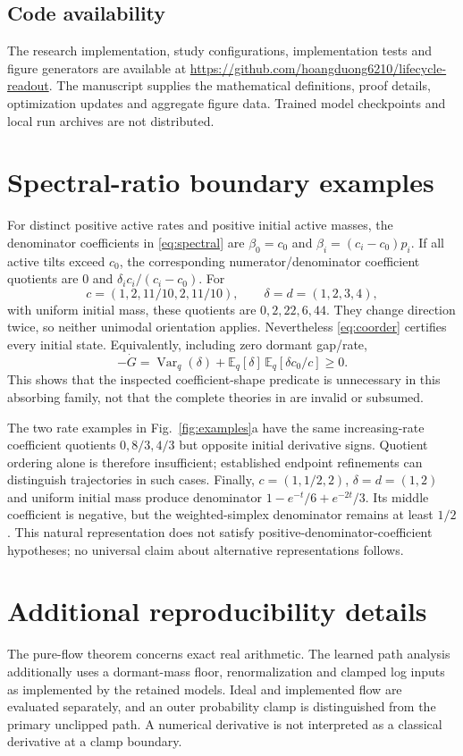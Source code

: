 \subsection*{Code availability}
The research implementation, study configurations, implementation tests and figure generators are available at \url{https://github.com/hoangduong6210/lifecycle-readout}. The manuscript supplies the mathematical definitions, proof details, optimization updates and aggregate figure data. Trained model checkpoints and local run archives are not distributed.
\begin{appendices}
\section{Spectral-ratio boundary examples}\label{app:spectral}
For distinct positive active rates and positive initial active masses, the denominator coefficients in \eqref{eq:spectral} are $\beta_0=c_0$ and $\beta_i=(c_i-c_0)p_i$. If all active tilts exceed $c_0$, the corresponding numerator/denominator coefficient quotients are $0$ and $\delta_i c_i/(c_i-c_0)$. For
\[
c=(1,2,11/10,2,11/10),\qquad \delta=d=(1,2,3,4),
\]
with uniform initial mass, these quotients are $0,2,22,6,44$. They change direction twice, so neither unimodal orientation applies. Nevertheless \eqref{eq:coorder} certifies every initial state. Equivalently, including zero dormant gap/rate,
\[
-\dot G=\operatorname{Var}_q(\delta)
+\mathbb E_q[\delta]\,\mathbb E_q[\delta c_0/c]\ge0.
\]
This shows that the inspected coefficient-shape predicate is unnecessary in this absorbing family, not that the complete theories in \cite{series,karp} are invalid or subsumed.

The two rate examples in Fig.~\ref{fig:examples}a have the same increasing-rate coefficient quotients $0,8/3,4/3$ but opposite initial derivative signs. Quotient ordering alone is therefore insufficient; established endpoint refinements can distinguish trajectories in such cases. Finally, $c=(1,1/2,2)$, $\delta=d=(1,2)$ and uniform initial mass produce denominator
$1-e^{-t}/6+e^{-2t}/3$. Its middle coefficient is negative, but the weighted-simplex denominator remains at least $1/2$. This natural representation does not satisfy positive-denominator-coefficient hypotheses; no universal claim about alternative representations follows.

\section{Additional reproducibility details}\label{app:reproduction}
The pure-flow theorem concerns exact real arithmetic. The learned path analysis additionally uses a dormant-mass floor, renormalization and clamped log inputs as implemented by the retained models. Ideal and implemented flow are evaluated separately, and an outer probability clamp is distinguished from the primary unclipped path. A numerical derivative is not interpreted as a classical derivative at a clamp boundary.


\end{appendices}
